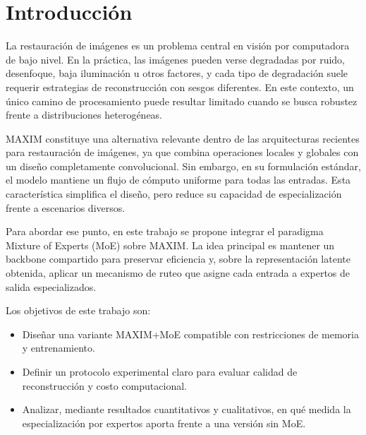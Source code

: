 \documentclass[aps,prl,twocolumn,groupedaddress]{revtex4-2}
\begin{document}

\maketitle

\section{Introducción}

La restauración de imágenes es un problema central en visión por computadora de bajo nivel. En la práctica, las imágenes pueden verse degradadas por ruido, desenfoque, baja iluminación u otros factores, y cada tipo de degradación suele requerir estrategias de reconstrucción con sesgos diferentes. En este contexto, un único camino de procesamiento puede resultar limitado cuando se busca robustez frente a distribuciones heterogéneas.

MAXIM constituye una alternativa relevante dentro de las arquitecturas recientes para restauración de imágenes, ya que combina operaciones locales y globales con un diseño completamente convolucional. Sin embargo, en su formulación estándar, el modelo mantiene un flujo de cómputo uniforme para todas las entradas. Esta característica simplifica el diseño, pero reduce su capacidad de especialización frente a escenarios diversos.

Para abordar ese punto, en este trabajo se propone integrar el paradigma Mixture of Experts (MoE) sobre MAXIM. La idea principal es mantener un backbone compartido para preservar eficiencia y, sobre la representación latente obtenida, aplicar un mecanismo de ruteo que asigne cada entrada a expertos de salida especializados.

Los objetivos de este trabajo son:
\begin{itemize}
    \item Diseñar una variante MAXIM+MoE compatible con restricciones de memoria y entrenamiento.
    \item Definir un protocolo experimental claro para evaluar calidad de reconstrucción y costo computacional.
    \item Analizar, mediante resultados cuantitativos y cualitativos, en qué medida la especialización por expertos aporta frente a una versión sin MoE.
\end{itemize}
\end{document}
